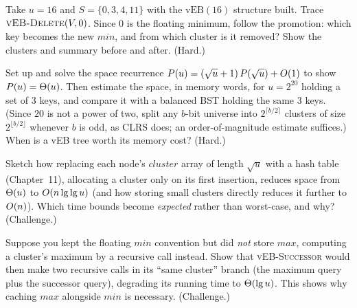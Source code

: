 \begin{exercise}
Take $u=16$ and $S=\{0,3,4,11\}$ with the $\text{vEB}(16)$ structure built. Trace
$\textsc{vEB-Delete}(V, 0)$. Since $0$ is the floating minimum, follow the
promotion: which key becomes the new $\mathit{min}$, and from which cluster is it
removed? Show the clusters and summary before and after. (Hard.)
\end{exercise}

\begin{exercise}
\label{ch21:ex-space}
Set up and solve the space recurrence $P(u) = (\sqrt u + 1)\,P(\sqrt u)+O(1)$ to
show $P(u)=\Theta(u)$. Then estimate the space, in memory words, for $u = 2^{20}$ holding a
set of $3$ keys, and compare it with a balanced BST holding the same $3$ keys.
(Since $20$ is not a power of two, split any $b$-bit universe into
$2^{\lceil b/2 \rceil}$ clusters of size $2^{\lfloor b/2 \rfloor}$ whenever $b$ is
odd, as CLRS does; an order-of-magnitude estimate suffices.)
When is a vEB tree worth its memory cost? (Hard.)
\end{exercise}

\begin{exercise}
Sketch how replacing each node's $\mathit{cluster}$ array of length $\sqrt{u}$ with a hash
table (Chapter~11), allocating a cluster only on its first insertion,
reduces space from $\Theta(u)$ to $O(n \lg\lg u)$ (and how storing small clusters directly reduces it further to $O(n)$). Which time bounds become \emph{expected} rather than
worst-case, and why? (Challenge.)
\end{exercise}

\begin{exercise}
Suppose you kept the floating $\mathit{min}$ convention but did \emph{not} store
$\mathit{max}$, computing a cluster's maximum by a recursive
call instead. Show that \textsc{vEB-Successor} would then make two recursive calls in its
``same cluster'' branch (the maximum query plus the successor query), degrading its
running time to $\Theta(\lg u)$. This shows why caching
$\mathit{max}$ alongside $\mathit{min}$ is necessary. (Challenge.)
\end{exercise}

